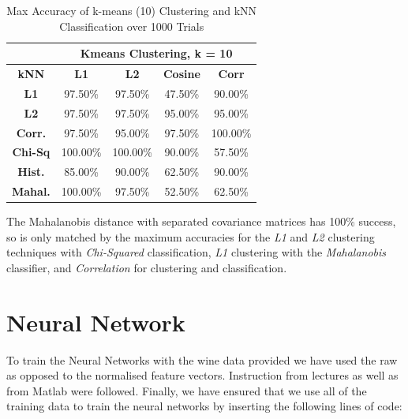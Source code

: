 \documentclass[10pt,twocolumn,letterpaper]{article}
\begin{document}
\begin{table}[H]
\caption{Max Accuracy of k-means (10) Clustering and kNN Classification over 1000 Trials \label{tab:kmeans_max10}}
\footnotesize
\begin{center}
\begin{tabular}{|c| c c c c|}
\cline{2-5}
\multicolumn{1}{c|}{ } & \multicolumn{4}{|c|}{\bf Kmeans Clustering, k = 10} \\
\hline

\bf kNN &\bf L1 &\bf L2 &\bf Cosine &\bf Corr \\ [0.5ex]
\hline
\bf L1 & 97.50\% & 97.50\%  & 47.50\% & 90.00\%\\ [0.5ex]
\hline
\bf L2 & 97.50\% & 97.50\%  & 95.00\% & 95.00\%\\ [0.5ex]
\hline
\bf Corr. & 97.50\% & 95.00\%  & 97.50\% & 100.00\%\\ [0.5ex]
\hline
\bf Chi-Sq & 100.00\% & 100.00\%  & 90.00\% & 57.50\%\\ [0.5ex]
\hline
\bf Hist. & 85.00\% & 90.00\%  & 62.50\% & 90.00\%\\ [0.5ex]
\hline
\bf Mahal. & 100.00\% & 97.50\% & 52.50\% & 62.50\%\\ [0.5ex]
\hline
\end{tabular}
\end{center}
\end{table}

The Mahalanobis distance with separated covariance matrices has 100\% success, so is only matched by the maximum accuracies for the \textit{L1} and \textit{L2} clustering techniques with \textit{Chi-Squared} classification, \textit{L1} clustering with the \textit{Mahalanobis} classifier, and \textit{Correlation} for clustering and classification.

\section{Neural Network}

To train the Neural Networks with the wine data provided we have used the raw as opposed to the normalised feature vectors. Instruction from lectures as well as from Matlab \cite{MatlabWine} were followed.  Finally, we have ensured that we use all of the training data to train the neural networks by inserting the following lines of code:

\begin{center}
\end{center}
\end{document}
